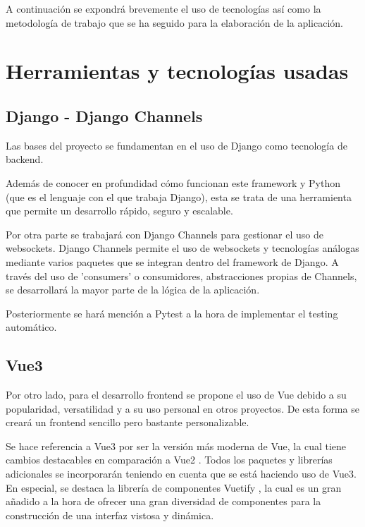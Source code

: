 A continuación se expondrá brevemente el uso de tecnologías así como la metodología
de trabajo que se ha seguido para la elaboración de la aplicación.

\section{Herramientas y tecnologías usadas}

\subsection{Django - Django Channels}

Las bases del proyecto se fundamentan en el uso de Django \cite{django} como tecnología de backend.

Además de conocer en profundidad cómo funcionan este framework y Python (que es el lenguaje con el que trabaja Django),
esta se trata de una herramienta que permite un desarrollo rápido, seguro y escalable.

Por otra parte se trabajará con Django Channels \cite{djangoChannels} para gestionar el uso de websockets. Django Channels
permite el uso de websockets y tecnologías análogas mediante varios paquetes que se integran dentro del framework de Django.
A través del uso de 'consumers' o consumidores, abstracciones propias de Channels, 
se desarrollará la mayor parte de la lógica de la aplicación. 

Posteriormente se hará mención a Pytest \cite{pytest} a la hora de implementar el testing automático.

\subsection{Vue3}

Por otro lado, para el desarrollo frontend se propone el uso de Vue \cite{vue3} debido a su popularidad, versatilidad
y a su uso personal en otros proyectos. De esta forma se creará un frontend sencillo pero bastante personalizable.

Se hace referencia a Vue3 por ser la versión más moderna de Vue, la cual tiene cambios destacables en comparación
a Vue2 \cite{vue3vue2}. Todos los paquetes y librerías adicionales se incorporarán teniendo en cuenta que se está haciendo uso de
Vue3. En especial, se destaca la librería de componentes Vuetify \cite{vuetify}, la cual es un gran añadido a la hora de
ofrecer una gran diversidad de componentes para la construcción de una interfaz vistosa y dinámica.

